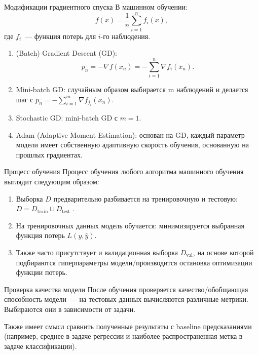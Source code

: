 \documentclass[notheorems, handout]{beamer}
\begin{document}
\begin{frame}{Модификации градиентного спуска}
	В машинном обучении:
	\[
		f(x)=\frac{1}{n}\sum_{i=1}^n f_i(x),
	\]
	где $f_i$~--- функция потерь для $i$-го наблюдения.\medskip
	\begin{enumerate}
		\item (Batch) Gradient Descent (GD):
		      \[
			      p_n=-\nabla f(x_n)=-\sum_{i=1}^n \nabla f_i(x_n).
		      \]
		\item Mini-batch GD: случайным образом выбирается \textsf{m} наблюдений и делается шаг с $p_n=-\sum_{i=1}^m \nabla f_{j_i}(x_n)$.\smallskip
		\item Stochastic GD: mini-batch GD с $m=1$.\smallskip
		\item Adam (Adaptive Moment Estimation): основан на GD, каждый параметр модели имеет собственную адаптивную скорость обучения, основанную на прошлых градиентах.
	\end{enumerate}
\end{frame}

\begin{frame}{Процесс обучения}
	Процесс обучения любого алгоритма машинного обучения выглядит следующим образом:
	\begin{enumerate}
		\item Выборка $D$ предварительно разбивается на тренировочную и тестовую: $D=D_\text{train} \sqcup D_\text{test}$ .\medskip
		\item На тренировочных данных модель обучается: минимизируется выбранная функция потерь $L(y, \hat y)$.\medskip
		\item Также часто присутствует и валидационная выборка $D_\text{val}$, на основе которой подбираются гиперпараметры модели/производится остановка оптимизации функции потерь.
	\end{enumerate}
\end{frame}

\begin{frame}{Проверка качества модели}
	После обучения проверяется качество/обобщающая способность модели~--- на тестовых данных вычисляются различные метрики. Выбираются они в зависимости от задачи.
	
	\begin{table}[h!]
		\centering
		\caption{Метрики для задач регрессии и классификации}
	\end{table}\medskip

	Также имеет смысл сравнить полученные результаты с baseline предсказаниями (например, среднее в задаче регрессии и наиболее распространенная метка в задаче классификации).
\end{frame}
\end{document}
